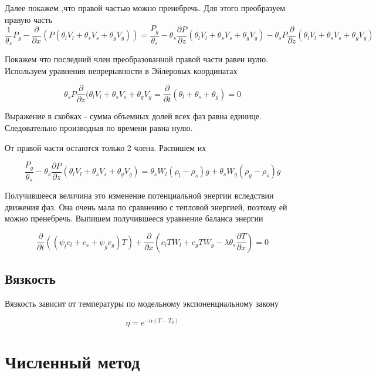 \documentclass[12pt,a4paper]{article}
\newcommand{\pd}[2]{\frac{\partial #1}{\partial #2}}
\begin{document}
Далее покажем ,что правой частью можно пренебречь. Для этого преобразуем правую часть
\begin{equation*}
\frac 1 {\theta_s} P_g - \pd{} x \left( P(\theta_l V_l + \theta_s V_s + \theta_g V_g)\right) = \frac {P_g}{\theta_s} - \theta_s \pd P z (\theta_l V_l + \theta_s V_s + \theta_g V_g) - \theta_s P \pd{}{z} (\theta_l V_l + \theta_s V_s + \theta_g V_g)
\end{equation*}

Покажем что последний член преобразованной правой части равен нулю. Используем уравнения непрерывности в Эйлеровых координатах

\begin{equation*}
\theta_s P \pd{}{z} (\theta_l V_l + \theta_s V_s + \theta_g V_g = \pd{} t (\theta_l +\theta_s + \theta_g) = 0
\end{equation*}

Выражение в скобках - сумма объемных долей всех фаз равна единице. Следовательно производная по времени равна нулю.

От правой части остаются только 2 члена. Распишем их

\begin{equation*}
\frac {P_g}{\theta_s} - \theta_s \pd P z (\theta_l V_l + \theta_s V_s + \theta_g V_g) = \theta_s W_l(\rho_l - \rho_s) g + \theta_s W_g(\rho_g - \rho_s)g
\end{equation*}

Получившееся величина это изменение потенциальной энергии вследствии движения фаз. Она очень мала по сравнению с тепловой энергией, поэтому ей можно пренебречь. Выпишем получившееся уравнение баланса энергии

\begin{equation}
\pd{} t \left((\psi_l c_l + c_s + \psi_g c_g)T\right) + \pd{} x \left(c_l T W_l + c_g T W_g - \lambda \theta_s \pd T x\right) = 0
\label{energy_conserv_res}
\end{equation}

\subsection{Вязкость}

Вязкость зависит от температуры по модельному экспоненциальному закону

\begin{equation}
\eta = e^{-\alpha(T - T_0)}
\end{equation}
\section{Численный метод}
\end{document}
